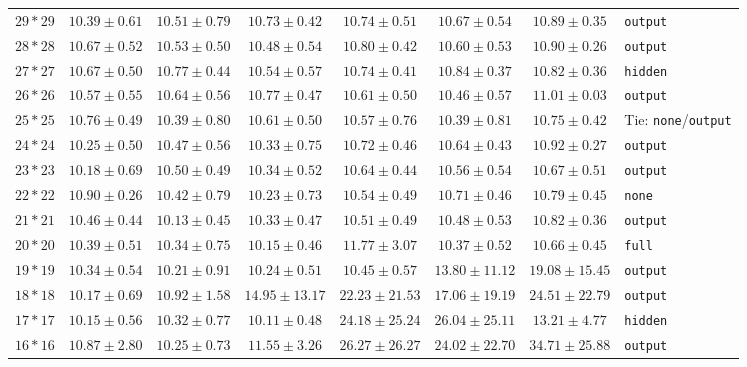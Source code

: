 \documentclass[conference]{IEEEtran}
\begin{document}
\begin{longtable}{@{}lccccccl@{}}
$29*29$ & $10.39 \pm 0.61$ & $10.51 \pm 0.79$ & $10.73 \pm 0.42$ & $10.74 \pm 0.51$ & $10.67 \pm 0.54$ & \bfseries $10.89 \pm 0.35$ & \texttt{output} \\
$28*28$ & $10.67 \pm 0.52$ & $10.53 \pm 0.50$ & $10.48 \pm 0.54$ & $10.80 \pm 0.42$ & $10.60 \pm 0.53$ & \bfseries $10.90 \pm 0.26$ & \texttt{output} \\
$27*27$ & $10.67 \pm 0.50$ & $10.77 \pm 0.44$ & $10.54 \pm 0.57$ & $10.74 \pm 0.41$ & \bfseries $10.84 \pm 0.37$ & $10.82 \pm 0.36$ & \texttt{hidden} \\
$26*26$ & $10.57 \pm 0.55$ & $10.64 \pm 0.56$ & $10.77 \pm 0.47$ & $10.61 \pm 0.50$ & $10.46 \pm 0.57$ & \bfseries $11.01 \pm 0.03$ & \texttt{output} \\
$25*25$ & \bfseries $10.76 \pm 0.49$ & $10.39 \pm 0.80$ & $10.61 \pm 0.50$ & $10.57 \pm 0.76$ & $10.39 \pm 0.81$ & \bfseries $10.75 \pm 0.42$ & Tie: \texttt{none}/\texttt{output} \\
$24*24$ & $10.25 \pm 0.50$ & $10.47 \pm 0.56$ & $10.33 \pm 0.75$ & $10.72 \pm 0.46$ & $10.64 \pm 0.43$ & \bfseries $10.92 \pm 0.27$ & \texttt{output} \\
$23*23$ & $10.18 \pm 0.69$ & $10.50 \pm 0.49$ & $10.34 \pm 0.52$ & $10.64 \pm 0.44$ & $10.56 \pm 0.54$ & \bfseries $10.67 \pm 0.51$ & \texttt{output} \\
$22*22$ & \bfseries $10.90 \pm 0.26$ & $10.42 \pm 0.79$ & $10.23 \pm 0.73$ & $10.54 \pm 0.49$ & $10.71 \pm 0.46$ & $10.79 \pm 0.45$ & \texttt{none} \\
$21*21$ & $10.46 \pm 0.44$ & $10.13 \pm 0.45$ & $10.33 \pm 0.47$ & $10.51 \pm 0.49$ & $10.48 \pm 0.53$ & \bfseries $10.82 \pm 0.36$ & \texttt{output} \\
$20*20$ & $10.39 \pm 0.51$ & $10.34 \pm 0.75$ & $10.15 \pm 0.46$ & \bfseries $11.77 \pm 3.07$ & $10.37 \pm 0.52$ & $10.66 \pm 0.45$ & \texttt{full} \\
$19*19$ & $10.34 \pm 0.54$ & $10.21 \pm 0.91$ & $10.24 \pm 0.51$ & $10.45 \pm 0.57$ & $13.80 \pm 11.12$ & \bfseries $19.08 \pm 15.45$ & \texttt{output} \\
$18*18$ & $10.17 \pm 0.69$ & $10.92 \pm 1.58$ & $14.95 \pm 13.17$ & $22.23 \pm 21.53$ & $17.06 \pm 19.19$ & \bfseries $24.51 \pm 22.79$ & \texttt{output} \\
$17*17$ & $10.15 \pm 0.56$ & $10.32 \pm 0.77$ & $10.11 \pm 0.48$ & $24.18 \pm 25.24$ & \bfseries $26.04 \pm 25.11$ & $13.21 \pm 4.77$ & \texttt{hidden} \\
$16*16$ & $10.87 \pm 2.80$ & $10.25 \pm 0.73$ & $11.55 \pm 3.26$ & $26.27 \pm 26.27$ & $24.02 \pm 22.70$ & \bfseries $34.71 \pm 25.88$ & \texttt{output} \\

\end{longtable}
\end{document}
